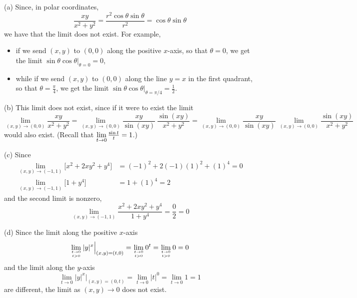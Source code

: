 \begin{solution}
(a) Since, in polar coordinates,
\begin{equation*}
\frac{xy}{x^2+y^2}=\frac{r^2\cos\theta\sin\theta}{r^2}
=\cos\theta\sin\theta
\end{equation*}
we have that the limit does not exist. For example, 
\begin{itemize}
\item if we send $(x,y)$
to $(0,0)$ along the positive $x$-axis, so that $\theta=0$, 
we get the limit $\sin\theta\cos\theta\big|_{\theta=0}=0$, 
\item
while if we send $(x,y)$ to $(0,0)$ along the line $y=x$ in the first quadrant, 
so that  $\theta=\frac{\pi}{4}$, we get the limit $\sin\theta\cos\theta\big|_{\theta=\pi/4}=\frac{1}{2}$.
\end{itemize}

(b) This limit does not exist, since if it were to exist the limit
\begin{equation*}
\lim_{(x,y)\rightarrow(0,0)}\frac{xy}{x^2+y^2}
=\lim_{(x,y)\rightarrow(0,0)}\frac{xy}{\sin(xy)}\ \frac{\sin(xy)}{x^2+y^2}
=\lim_{(x,y)\rightarrow(0,0)}\frac{xy}{\sin(xy)}\ 
\lim_{(x,y)\rightarrow(0,0)}\frac{\sin(xy)}{x^2+y^2}
\end{equation*}
would also exist. (Recall that $\displaystyle\lim_{t\rightarrow 0}\tfrac{\sin t}{t}
=1$.)


(c) Since
\begin{align*}
\lim_{(x,y)\rightarrow(-1,1)}\big[x^2+2xy^2+y^4\big]
&=(-1)^2+2(-1)(1)^2+(1)^4=0 \\
\lim_{(x,y)\rightarrow(-1,1)}\big[1+y^4\big]
&=1+(1)^4=2
\end{align*}
and the second limit is nonzero,
\begin{equation*}
\lim_{(x,y)\rightarrow(-1,1)}\frac{x^2+2xy^2+y^4}{1+y^4}=\frac{0}{2}=0
\end{equation*}




(d)  Since the limit along the positive $x$-axis
\begin{equation*}
\lim_{\Atop{t\rightarrow 0}{t>0}}|y|^x\Big|_{(x,y)=(t,0)}
=\lim_{\Atop{t\rightarrow 0}{t>0}}0^t
=\lim_{\Atop{t\rightarrow 0}{t>0}}0
=0
\end{equation*}
and the limit along the $y$-axis
\begin{equation*}
\lim_{t\rightarrow 0}|y|^x\Big|_{(x,y)=(0,t)}
=\lim_{t\rightarrow 0}|t|^0
=\lim_{t\rightarrow 0}1
=1
\end{equation*}
are different, the limit as $(x,y)\rightarrow 0$ does not exist.
\end{solution}

